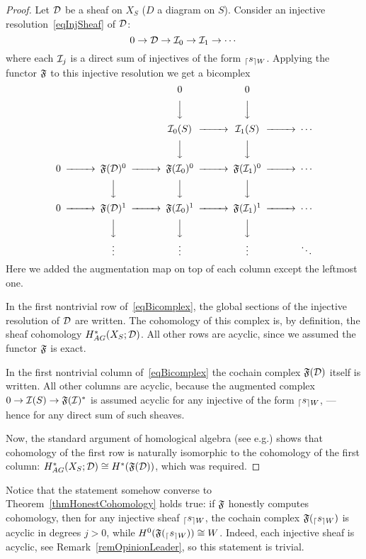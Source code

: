 \begin{proof}
Let $\mathcal{D}$ be a sheaf on $X_S$ ($D$ a diagram on $S$). Consider an injective resolution~\eqref{eqInjSheaf} of $\mathcal{D}$:
\[
0\to \mathcal{D}\to \mathcal{I}_0\to \mathcal{I}_1\to\cdots
\]
where each $\mathcal{I}_j$ is a direct sum of injectives of the form ${_{\lceil}s_{\rceil W}}$. Applying the functor $\mathfrak{F}$ to this injective resolution we get a bicomplex
\begin{equation}\label{eqBicomplex}
\begin{CD}
@.   @. 0 @. 0 @.\\
@. @. @VVV @VVV @.\\
@. @. \ca{I}_0(S) @>>> \ca{I}_1(S) @>>> \cdots\\
@. @. @VVV @VVV @.\\
0 @>>> \Fu(\ca{D})^0 @>>> \Fu(\ca{I}_0)^0 @>>> \Fu(\ca{I}_1)^0 @>>> \cdots\\
@. @VVV @VVV @VVV @.\\
0 @>>> \Fu(\ca{D})^1 @>>> \Fu(\ca{I}_0)^1 @>>> \Fu(\ca{I}_1)^1 @>>> \cdots\\
@. @VVV @VVV @VVV @.\\
@.\vdots @.\vdots @.\vdots @.\ddots
\end{CD}
\end{equation}
Here we added the augmentation map on top of each column except the leftmost one.

In the first nontrivial row of~\eqref{eqBicomplex}, the global sections of the injective resolution of $\mathcal{D}$ are written. The cohomology of this complex is, by definition, the sheaf cohomology $H_{AG}^*(X_S;\mathcal{D})$. All other rows are acyclic, since we assumed the functor $\mathfrak{F}$ is exact.

In the first nontrivial column of~\eqref{eqBicomplex} the cochain complex $\mathfrak{F}(\mathcal{D})$ itself is written. All other columns are acyclic, because the augmented complex $0\to \mathcal{I}(S)\to \mathfrak{F}(\mathcal{I})^*$ is assumed acyclic for any injective of the form ${_{\lceil}s_{\rceil W}}$, --- hence for any direct sum of such sheaves.

Now, the standard argument of homological algebra (see e.g.\cite[Theorem 2.15]{SpectralSeq}) shows that cohomology of the first row is naturally isomorphic to the cohomology of the first column: $H^*_{AG}(X_S;\mathcal{D})\cong H^*(\mathfrak{F}(\mathcal{D}))$, which was required.
\end{proof}

\begin{rem}\label{remInjectiveAcyclic}
Notice that the statement somehow converse to Theorem~\ref{thmHonestCohomology} holds true: if $\mathfrak{F}$ honestly computes cohomology, then for any injective sheaf ${_{\lceil}s_{\rceil W}}$, the cochain complex $\mathfrak{F}({_{\lceil}s_{\rceil W}})$ is acyclic in degrees $j>0$, while $H^0(\mathfrak{F}({_{\lceil}s_{\rceil W}}))\cong W$. Indeed, each injective sheaf is acyclic, see Remark~\ref{remOpinionLeader}, so this statement is trivial.
\end{rem}

